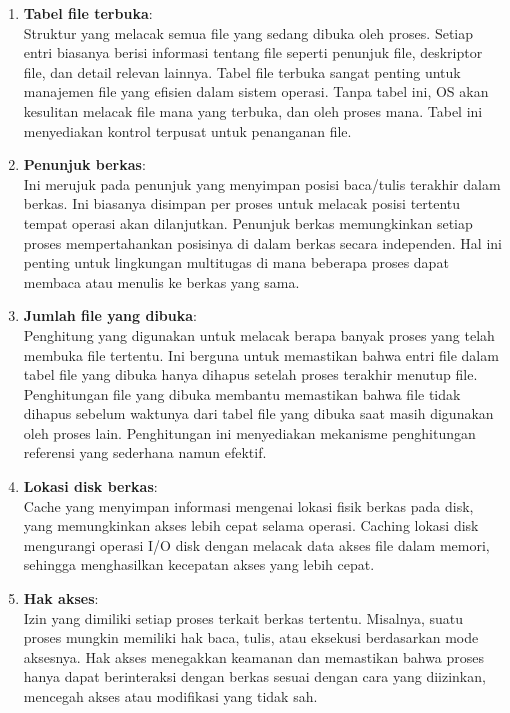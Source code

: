 \documentclass[12pt]{article}
\begin{document}
\begin{enumerate}
    \item \textbf{Tabel file terbuka}: \\
    Struktur yang melacak semua file yang sedang dibuka oleh proses. Setiap entri biasanya berisi informasi tentang file seperti penunjuk file, deskriptor file, dan detail relevan lainnya. Tabel file terbuka sangat penting untuk manajemen file yang efisien dalam sistem operasi. Tanpa tabel ini, OS akan kesulitan melacak file mana yang terbuka, dan oleh proses mana. Tabel ini menyediakan kontrol terpusat untuk penanganan file.

    \item \textbf{Penunjuk berkas}: \\
    Ini merujuk pada penunjuk yang menyimpan posisi baca/tulis terakhir dalam berkas. Ini biasanya disimpan per proses untuk melacak posisi tertentu tempat operasi akan dilanjutkan. Penunjuk berkas memungkinkan setiap proses mempertahankan posisinya di dalam berkas secara independen. Hal ini penting untuk lingkungan multitugas di mana beberapa proses dapat membaca atau menulis ke berkas yang sama.

    \item \textbf{Jumlah file yang dibuka}: \\
    Penghitung yang digunakan untuk melacak berapa banyak proses yang telah membuka file tertentu. Ini berguna untuk memastikan bahwa entri file dalam tabel file yang dibuka hanya dihapus setelah proses terakhir menutup file. Penghitungan file yang dibuka membantu memastikan bahwa file tidak dihapus sebelum waktunya dari tabel file yang dibuka saat masih digunakan oleh proses lain. Penghitungan ini menyediakan mekanisme penghitungan referensi yang sederhana namun efektif.

    \item \textbf{Lokasi disk berkas}: \\
    Cache yang menyimpan informasi mengenai lokasi fisik berkas pada disk, yang memungkinkan akses lebih cepat selama operasi. Caching lokasi disk mengurangi operasi I/O disk dengan melacak data akses file dalam memori, sehingga menghasilkan kecepatan akses yang lebih cepat.

    \item \textbf{Hak akses}: \\
    Izin yang dimiliki setiap proses terkait berkas tertentu. Misalnya, suatu proses mungkin memiliki hak baca, tulis, atau eksekusi berdasarkan mode aksesnya. Hak akses menegakkan keamanan dan memastikan bahwa proses hanya dapat berinteraksi dengan berkas sesuai dengan cara yang diizinkan, mencegah akses atau modifikasi yang tidak sah.

\end{enumerate}
\end{document}
